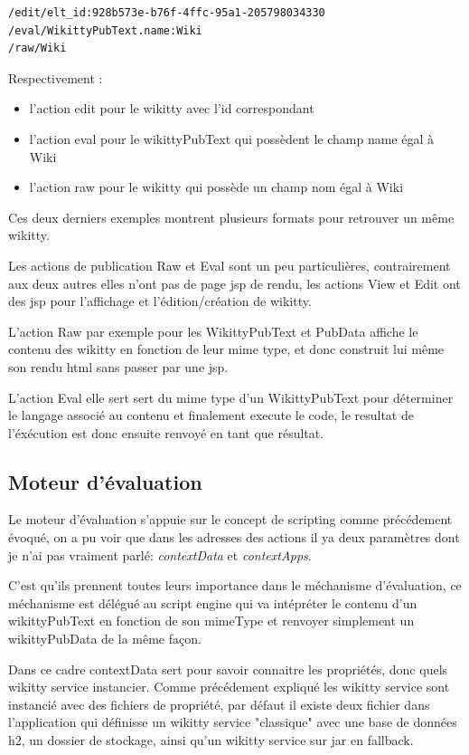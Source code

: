 \begin{verbatim}
/edit/elt_id:928b573e-b76f-4ffc-95a1-205798034330 
/eval/WikittyPubText.name:Wiki
/raw/Wiki
\end{verbatim}


Respectivement :
\begin{itemize}
\item l'action edit pour le wikitty avec l'id correspondant
\item l'action eval pour le wikittyPubText qui possèdent le champ name égal à
Wiki
\item l'action raw pour le wikitty qui possède un champ nom égal à Wiki
\end{itemize}

Ces deux derniers exemples montrent plusieurs formats pour retrouver un même
wikitty. 

Les actions de publication Raw et Eval sont un peu particulières, contrairement
aux deux autres elles n'ont pas de page jsp de rendu, les actions View et Edit
ont des jsp pour l'affichage et l'édition/création de wikitty.

L'action Raw par exemple pour les WikittyPubText et PubData affiche le contenu
des wikitty en fonction de leur mime type, et donc construit lui même son rendu
html sans passer par une jsp.

L'action Eval elle sert sert du mime type d'un WikittyPubText pour déterminer le
langage associé au contenu et finalement execute le code, le resultat de
l'éxécution est donc ensuite renvoyé en tant que résultat.

\subsection{Moteur d'évaluation}

Le moteur d'évaluation s'appuie sur le concept de scripting comme précédement 
évoqué, on a pu voir que dans les adresses des actions il ya deux paramètres
dont je n'ai pas vraiment parlé: \emph{contextData} et \emph{contextApps}.

C'est qu'ils prennent toutes leurs importance dans le méchanisme d'évaluation,
ce méchanisme est délégué au script engine qui va intépréter le contenu
d'un wikittyPubText en fonction de son mimeType et renvoyer simplement un 
wikittyPubData de la même façon.

Dans ce cadre contextData sert pour savoir connaitre les propriétés, donc
quels wikitty service instancier. Comme précédement expliqué les wikitty service 
sont instancié avec des fichiers de propriété, par défaut il existe deux fichier
dans l'application qui définisse un wikitty service "classique" avec une base
de données h2, un dossier de stockage, ainsi qu'un wikitty service sur jar
en fallback. 


